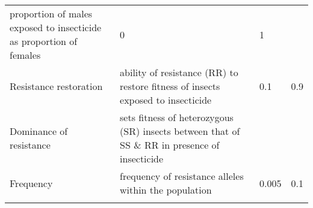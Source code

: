 \documentclass[11pt,]{article}
\begin{document}
\begin{longtable}[]{@{}llll@{}}
\begin{minipage}[t]{0.46\columnwidth}
proportion of males exposed to insecticide as proportion of
females\strut
\end{minipage} & \begin{minipage}[t]{0.07\columnwidth}\raggedright\strut
0\strut
\end{minipage} & \begin{minipage}[t]{0.07\columnwidth}\raggedright\strut
1\strut
\end{minipage}\tabularnewline
\begin{minipage}[t]{0.28\columnwidth}\raggedright\strut
Resistance restoration\strut
\end{minipage} & \begin{minipage}[t]{0.46\columnwidth}\raggedright\strut
ability of resistance (RR) to restore fitness of insects exposed to
insecticide\strut
\end{minipage} & \begin{minipage}[t]{0.07\columnwidth}\raggedright\strut
0.1\strut
\end{minipage} & \begin{minipage}[t]{0.07\columnwidth}\raggedright\strut
0.9\strut
\end{minipage}\tabularnewline
\begin{minipage}[t]{0.28\columnwidth}\raggedright\strut
Dominance of resistance\strut
\end{minipage} & \begin{minipage}[t]{0.46\columnwidth}\raggedright\strut
sets fitness of heterozygous (SR) insects between that of SS \& RR in
presence of insecticide\strut
\end{minipage} & \begin{minipage}[t]{0.07\columnwidth}\raggedright\strut
\strut
\end{minipage}\tabularnewline
\begin{minipage}[t]{0.28\columnwidth}\raggedright\strut
Frequency\strut
\end{minipage} & \begin{minipage}[t]{0.46\columnwidth}\raggedright\strut
frequency of resistance alleles within the population\strut
\end{minipage} & \begin{minipage}[t]{0.07\columnwidth}\raggedright\strut
0.005\strut
\end{minipage} & \begin{minipage}[t]{0.07\columnwidth}\raggedright\strut
0.1\strut
\end{minipage}\tabularnewline
\begin{minipage}[t]{0.28\columnwidth}\raggedright\strut

\end{minipage}
\end{longtable}
\end{document}
